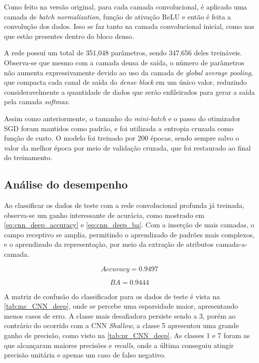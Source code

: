 Como feito na versão original, para cada camada convolucional, é aplicado uma camada de \textit{batch normalization}, função de ativação ReLU e então é feita a convolução dos dados. Isso se faz tanto na camada convolucional inicial, como nas que estão presentes dentro do bloco denso.

A rede possuí um total de 351,048 parâmetros, sendo 347,656 deles treináveis. Observa-se que mesmo com a camada densa de saída, o número de parâmetros não aumenta expressivamente devido ao uso da camada de \textit{global average pooling}, que compacta cada canal de saída do \textit{dense block} em um único valor, reduzindo consideravelmente a quantidade de dados que serão enfileirados para gerar a saída pela camada \textit{softmax}. 

Assim como anteriormente, o tamanho do \textit{mini-batch} e o passo do otimizador SGD foram mantidos como padrão, e foi utilizada a entropia cruzada como função de custo. O modelo foi treinado por 200 épocas, sendo sempre salvo o valor da melhor época por meio de validação cruzada, que foi restaurado ao final do treinamento.

\subsection{Análise do desempenho}

Ao classificar os dados de teste com a rede convolucional profunda já treinada, observa-se um ganho interessante de acurácia, como mostrado em \eqref{eq:cnn_deep_accuracy} e \eqref{eq:cnn_deep_ba}. Com a inserção de mais camadas, o campo receptivo se amplia, permitindo o aprendizado de padrões mais complexos, e o aprendizado da representação, por meio da extração de atributos camada-a-camada.

\begin{equation}\label{eq:cnn_deep_accuracy}
	Accuracy = 0.9497
\end{equation}

\begin{equation}\label{eq:cnn_deep_ba}
	BA = 0.9444
\end{equation}

A matriz de confusão do classificador para os dados de teste é vista na \autoref{tab:mc_CNN_deep}, onde se percebe uma esparsidade maior, apresentando menos casos de erro. A classe mais desafiadora persiste sendo a 3, porém ao contrário do ocorrido com a CNN \textit{Shallow}, a classe 5 apresentou uma grande ganho de precisão, como visto na \autoref{tab:pr_CNN_deep}. As classes 1 e 7 foram as que alcançaram maiores precisões e \textit{recalls}, onde a última conseguiu atingir precisão unitária e apenas um caso de falso negativo.

